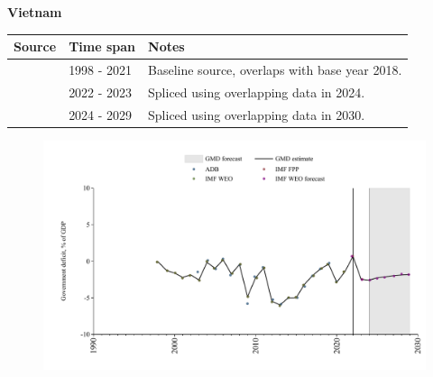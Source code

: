 \documentclass[12pt,a4paper,landscape]{article}
\begin{document}
\begin{adjustbox}{max totalsize={\paperwidth}{\paperheight},center}
\begin{minipage}[t][\textheight][t]{\textwidth}
\vspace*{0.5cm}
{}
\begin{center}
{\Large\bfseries Vietnam}
\end{center}
\vspace{0.5cm}
\begin{table}[H]
\centering
\small
\begin{tabular}{|l|l|l|}
\hline
\textbf{Source} & \textbf{Time span} & \textbf{Notes} \\
\hline
\rowcolor{white}\cite{IMF_WEO}& 1998 - 2021 &Baseline source, overlaps with base year 2018.\\
\rowcolor{lightgray}\cite{IMF_FPP}& 2022 - 2023 &Spliced using overlapping data in 2024.\\
\rowcolor{white}\cite{IMF_WEO_forecast}& 2024 - 2029 &Spliced using overlapping data in 2030.\\
\hline
\end{tabular}
\end{table}
\begin{figure}[H]
\centering
\includegraphics[width=\textwidth,height=0.6\textheight,keepaspectratio]{graphs/VNM_govdef_GDP.pdf}
\end{figure}
\end{minipage}
\end{adjustbox}
\end{document}
